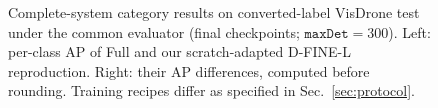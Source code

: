 \begin{figure}[t]
\centering
\visualClasses{\textwidth}
\caption{Complete-system category results on converted-label VisDrone test under the common evaluator (final checkpoints; $\texttt{maxDet}=300$). Left: per-class AP of Full and our scratch-adapted D-FINE-L reproduction. Right: their AP differences, computed before rounding. Training recipes differ as specified in Sec.~\ref{sec:protocol}.}
\label{fig:externalclasses}
\end{figure}
